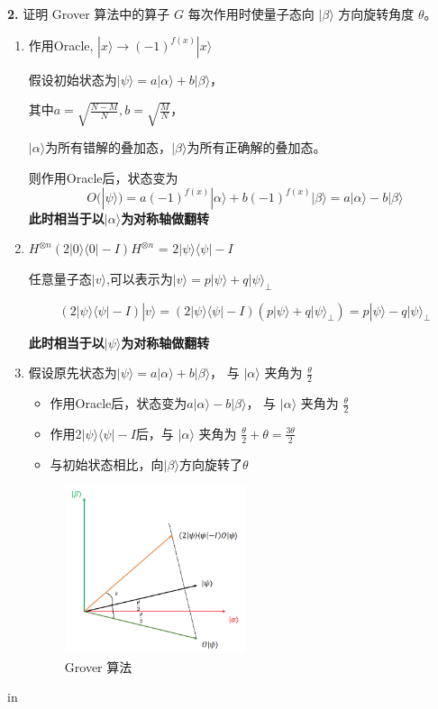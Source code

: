 \documentclass[11pt]{article}
\begin{document}
{\bf 2.} 证明 Grover 算法中的算子 $G$ 每次作用时使量子态向 $|\beta\rangle$ 方向旋转角度 $\theta$。
\begin{enumerate}
    \item 作用Oracle, $|x\rangle \rightarrow (-1)^{f(x)}|x\rangle$
    
    假设初始状态为$|\psi\rangle = a|\alpha\rangle + b|\beta\rangle$，
    
    其中$a = \sqrt{\frac{N-M}{N}}, b = \sqrt{\frac{M}{N}}$，

    $|\alpha\rangle$为所有错解的叠加态，$|\beta\rangle$为所有正确解的叠加态。

    则作用Oracle后，状态变为
    \[
    O(|\psi\rangle) = a(-1)^{f(x)}|\alpha\rangle + b(-1)^{f(x)}|\beta\rangle = a|\alpha\rangle - b|\beta\rangle
    \]
    \textbf{此时相当于以$|\alpha\rangle$为对称轴做翻转}
    \item $H^{\otimes n} (2|0\rangle \langle 0| - I) H^{\otimes n}$ = $2|\psi\rangle\langle \psi| - I$
    
    任意量子态$|v\rangle$,可以表示为$|v\rangle = p |\psi\rangle + q |\psi\rangle_{\perp}$

    \[
    (2|\psi\rangle\langle \psi| - I)|v\rangle = (2|\psi\rangle\langle \psi| - I)(p |\psi\rangle + q |\psi\rangle_{\perp}) 
    = p|\psi\rangle - q |\psi\rangle_{\perp}
    \]

    \textbf{此时相当于以$|\psi\rangle$为对称轴做翻转}

    \item 假设原先状态为$|\psi\rangle = a|\alpha\rangle + b|\beta\rangle$， 与 $|\alpha\rangle$ 夹角为 $\frac{\theta}{2}$
    \begin{itemize}
        \item 作用Oracle后，状态变为$a|\alpha\rangle - b|\beta\rangle$， 与 $|\alpha\rangle$ 夹角为 $\frac{\theta}{2}$
        \item 作用$2|\psi\rangle\langle \psi| - I$后，与 $|\alpha\rangle$ 夹角为 $\frac{\theta}{2} + \theta = \frac{3\theta}{2}$
        \item 与初始状态相比，向$|\beta\rangle$方向旋转了$\theta$
    \end{itemize}
    \begin{figure}[H]
        \centering
        \includegraphics[width=0.5\textwidth]{figures/2.png}
        \caption{Grover 算法}
    \end{figure}
    
\end{enumerate}
 in   
\end{document}

